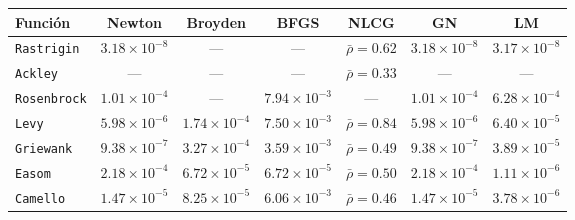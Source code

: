 \begin{tabular}{l c c c c c c}
\toprule
\rowcolor{Azul1!50}
Función & Newton & Broyden & BFGS & NLCG & GN & LM \\
\midrule
\texttt{Rastrigin} & $3.18\times10^{-8}$ & --- & --- & $\bar\rho=0.62$ & $3.18\times10^{-8}$ & $3.17\times10^{-8}$ \\
\texttt{Ackley} & --- & --- & --- & $\bar\rho=0.33$ & --- & --- \\
\texttt{Rosenbrock} & $1.01\times10^{-4}$ & --- & $7.94\times10^{-3}$ & --- & $1.01\times10^{-4}$ & $6.28\times10^{-4}$ \\
\texttt{Levy} & $5.98\times10^{-6}$ & $1.74\times10^{-4}$ & $7.50\times10^{-3}$ & $\bar\rho=0.84$ & $5.98\times10^{-6}$ & $6.40\times10^{-5}$ \\
\texttt{Griewank} & $9.38\times10^{-7}$ & $3.27\times10^{-4}$ & $3.59\times10^{-3}$ & $\bar\rho=0.49$ & $9.38\times10^{-7}$ & $3.89\times10^{-5}$ \\
\texttt{Easom} & $2.18\times10^{-4}$ & $6.72\times10^{-5}$ & $6.72\times10^{-5}$ & $\bar\rho=0.50$ & $2.18\times10^{-4}$ & $1.11\times10^{-6}$ \\
\texttt{Camello} & $1.47\times10^{-5}$ & $8.25\times10^{-5}$ & $6.06\times10^{-3}$ & $\bar\rho=0.46$ & $1.47\times10^{-5}$ & $3.78\times10^{-6}$ \\
\bottomrule
\end{tabular}

